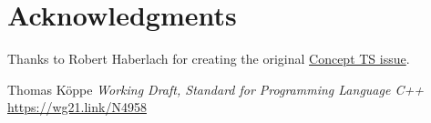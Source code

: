 \documentclass{wg21}
\begin{document}
\section{Acknowledgments}

Thanks to Robert Haberlach for creating the original  \href{http://cplusplus.github.io/concepts-ts/ts-active.html#28}{Concept TS issue}.





\renewcommand{\section}[2]{}%

\begin{thebibliography}{9}

Thomas Köppe
\emph{Working Draft, Standard for Programming Language C++}\newline
\url{https://wg21.link/N4958}


\end{thebibliography}
\end{document}

